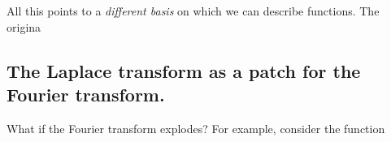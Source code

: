 \documentclass[letterpaper,12pt]{report}
\begin{document}
All this points to a \emph{different basis} on which we can describe functions.
The origina







\subsection{The Laplace transform as a patch for the Fourier transform.}

What if the Fourier transform explodes?
For example, consider the function








\end{document}
